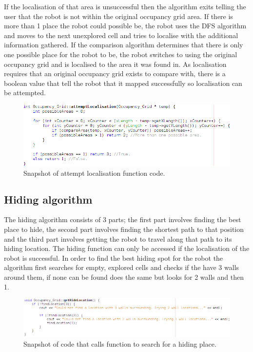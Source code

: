 \documentclass[a4paper,12pt]{article}
\begin{document}
\vspace{5mm}
\noindent If the localisation of that area is unsuccessful then the algorithm exits telling the user that the robot is not within the original occupancy grid area. If there is more than 1 place the robot could possible be, the robot uses the DFS algorithm and moves to the next unexplored cell and tries to localise with the additional information gathered. If the comparison algorithm determines that there is only one possible place for the robot to be, the robot switches to using the original occupancy grid and is localised to the area it was found in. As localisation requires that an original occupancy grid exists to compare with, there is a boolean value that tell the robot that it mapped successfully so localisation can be attempted.

\begin{figure}[H]
\includegraphics[scale=0.75]{Attempt_Localisation_SS.png}
\caption{Snapshot of attempt localisation function code.}
\end{figure}

\subsection{Hiding algorithm}
\noindent The hiding algorithm consists of 3 parts; the first part involves finding the best place to hide, the second part involves finding the shortest path to that position and the third part involves getting the robot to travel along that path to its hiding location. The hiding function can only be accessed if the localisation of the robot is successful. In order to find the best hiding spot for the robot the algorithm first searches for empty, explored cells and checks if the have 3 walls around them, if none can be found does the same but looks for 2 walls and then 1. 

\begin{figure}[H]
\includegraphics[scale=0.6]{Get_Hide_Location_SS.png}
\caption{Snapshot of code that calls function to search for a hiding place.}
\end{figure}
\end{document}
